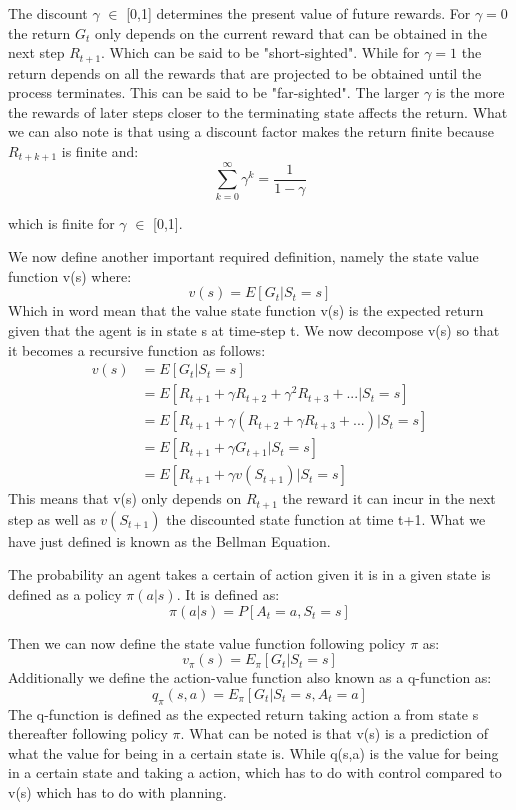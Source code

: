 The discount $\gamma$ $\in$ [0,1] determines the present value of future rewards. For $\gamma=0$ the return $G_t$ only depends on the current reward that can be obtained in the next step $R_{t+1}$. Which can be said to be "short-sighted". While for $\gamma=1$ the return depends on all the rewards that are projected to be obtained until the process terminates. This can be said to be "far-sighted". The larger $\gamma$ is the more the rewards of later steps closer to the terminating state affects the return.\cite{sutton_barto}
What we can also note is that using a discount factor makes the return finite because $R_{t+k+1}$ is finite and:
\[ \sum_{k=0}^{\infty}\gamma^{k}=\frac{1}{1-\gamma}\]
\centerline{which is finite for $\gamma$ $\in$ [0,1].}

We now define another important required definition, namely the state value function v(s) where:
\[v(s) = E[G_t | S_t = s]\]
Which in word mean that the value state function v(s) is the expected return given that the agent is in state s at time-step t.
We now decompose v(s) so that it becomes a recursive function as follows:
\begin{align}
	v(s) &= E[G_t | S_t = s]\\
	&= E[R_{t+1} + \gamma R_{t+2} + \gamma^{2} R_{t+3} + ...|S_t = s]\\
	&= E[R_{t+1} + \gamma (R_{t+2} + \gamma R_{t+3} + ...)|S_t = s]\\
	&= E[R_{t+1} + \gamma G_{t+1}|S_t = s]\\
	&= E[R_{t+1} + \gamma v(S_{t+1})|S_t = s]
	\label{bellmanv1}
\end{align}
This means that v(s) only depends on $R_{t+1}$ the reward it can incur in the next step as well as $v(S_{t+1})$ the discounted state function at time t+1.
What we have just defined is known as the Bellman Equation.\cite{sutton_barto}

The probability an agent takes a certain of action given it is in a given state is defined as a policy $\pi(a|s)$. It is defined as:
\[\pi(a|s) = P[A_t = a, S_t = s]\]

Then we can now define the state value function following policy $\pi$ as:
\[v_{\pi}(s) = E_{\pi}[G_t | S_t = s]\]
Additionally we define the action-value function also known as a q-function as:
\[q_{\pi}(s,a) = E_{\pi}[G_t | S_t = s,A_t = a]\]
The q-function is defined as the expected return taking action a from state s thereafter following policy $\pi$. What can be noted is that v(s) is a prediction of what the value for being in a certain state is. While q(s,a) is the value for being in a certain state and taking a action, which has to do with control compared to v(s) which has to do with planning. 

